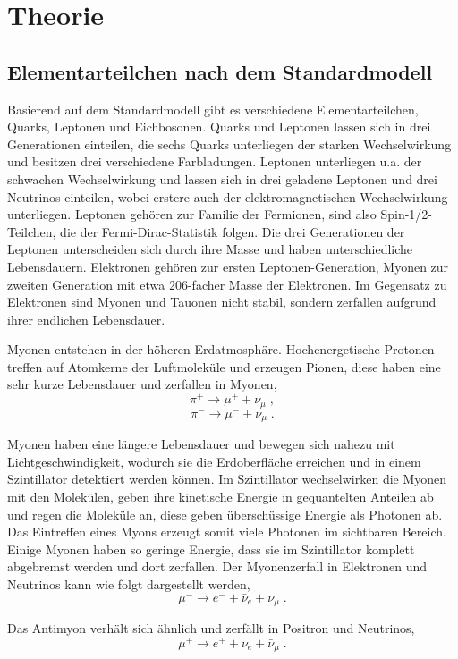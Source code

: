 \section{Theorie}

\cite{myon}

\subsection{Elementarteilchen nach dem Standardmodell}

Basierend auf dem Standardmodell gibt es verschiedene Elementarteilchen, Quarks, Leptonen und Eichbosonen. Quarks und Leptonen lassen sich in drei Generationen einteilen, die sechs Quarks unterliegen der starken Wechselwirkung und besitzen drei verschiedene Farbladungen. Leptonen unterliegen u.a. der schwachen Wechselwirkung und lassen sich in drei geladene Leptonen und drei Neutrinos einteilen, wobei erstere auch der elektromagnetischen Wechselwirkung unterliegen. Leptonen gehören zur Familie der Fermionen, sind also Spin-1/2-Teilchen, die der Fermi-Dirac-Statistik folgen. Die drei Generationen der Leptonen unterscheiden sich durch ihre Masse und haben unterschiedliche Lebensdauern. Elektronen gehören zur ersten Leptonen-Generation, Myonen zur zweiten Generation mit etwa 206-facher Masse der Elektronen. Im Gegensatz zu Elektronen sind Myonen und Tauonen nicht stabil, sondern zerfallen aufgrund ihrer endlichen Lebensdauer.

Myonen entstehen in der höheren Erdatmosphäre. Hochenergetische Protonen treffen auf Atomkerne der Luftmoleküle und erzeugen Pionen, diese haben eine sehr kurze Lebensdauer und zerfallen in Myonen, $$\pi^+ \rightarrow \mu^+ + \nu_\mu\; ,$$ $$\pi^- \rightarrow \mu^- + \bar{\nu}_\mu\; .$$

Myonen haben eine längere Lebensdauer und bewegen sich nahezu mit Lichtgeschwindigkeit, wodurch sie die Erdoberfläche erreichen und in einem Szintillator detektiert werden können. Im Szintillator wechselwirken die Myonen mit den Molekülen, geben ihre kinetische Energie in gequantelten Anteilen ab und regen die Moleküle an, diese geben überschüssige Energie als Photonen ab. Das Eintreffen eines Myons erzeugt somit viele Photonen im sichtbaren Bereich. Einige Myonen haben so geringe Energie, dass sie im Szintillator komplett abgebremst werden und dort zerfallen. Der Myonenzerfall in Elektronen und Neutrinos kann wie folgt dargestellt werden, $$\mu^- \rightarrow e^- + \bar{\nu}_e + \nu_\mu\; . $$

Das Antimyon verhält sich ähnlich und zerfällt in Positron und Neutrinos, $$\mu^+ \rightarrow e^+ + \nu_e + \bar{\nu}_\mu\; .$$

